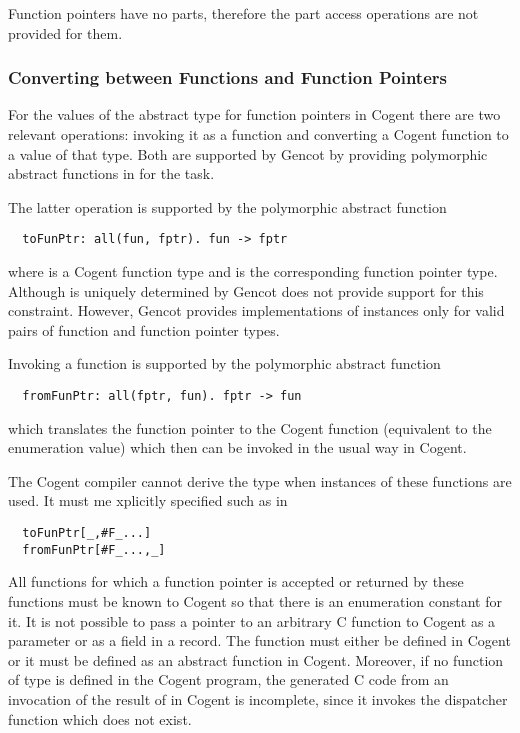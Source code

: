 Function pointers have no parts, therefore the part access operations are not provided for them.

\subsubsection{Converting between Functions and Function Pointers}

For the values of the abstract type for function pointers in Cogent there are two relevant operations: invoking
it as a function and converting a Cogent function to a value of that type. Both are supported by Gencot
by providing polymorphic abstract functions in  for the task.

The latter operation is supported by the polymorphic abstract function
\begin{verbatim}
  toFunPtr: all(fun, fptr). fun -> fptr
\end{verbatim}
where  is a Cogent function type and  is the corresponding function pointer type.
Although  is uniquely determined by  Gencot does not provide support for this constraint.
However, Gencot provides implementations of instances only for valid pairs of function and function pointer types.

Invoking a function is supported by the polymorphic abstract function
\begin{verbatim}
  fromFunPtr: all(fptr, fun). fptr -> fun
\end{verbatim}
which translates the function pointer to the Cogent function (equivalent to the enumeration value) which
then can be invoked in the usual way in Cogent. 

The Cogent compiler cannot derive the type  when instances of these functions are used. It
must me xplicitly specified such as in 
\begin{verbatim}
  toFunPtr[_,#F_...]
  fromFunPtr[#F_...,_]
\end{verbatim}

All functions for which a function pointer is accepted or returned by these functions must be known to
Cogent so that there is an enumeration constant for it. It is not possible to pass a pointer to an arbitrary 
C function to Cogent as a parameter or as a field in a record. The function must either be defined in Cogent 
or it must be defined as an abstract function 
in Cogent. Moreover, if no function of type  is defined in the Cogent program, the
generated C code from an invocation of the result of  in Cogent is incomplete, 
since it invokes the dispatcher function which does not exist.

